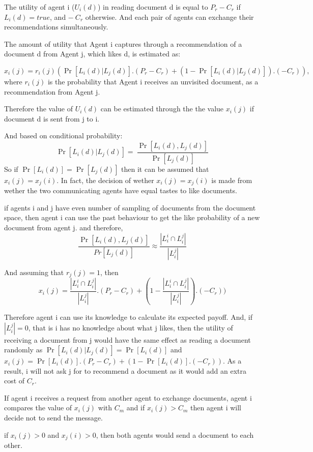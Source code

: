 \documentclass [12pt]{article} \usepackage{multicol}
\begin{document}
	The utility of agent i  ($U_i(d)$) in reading document d is equal to 
$P_r - C_r$ if $L_i(d) = true $, and  $- \ C_r$ otherwise. And each
pair of agents can exchange their recommendations simultaneously.

	The amount of utility that Agent i captures through a
recommendation of a document d from Agent j, which likes d, is
estimated as:

	$$ x_i(j) = r_i(j) (\Pr[L_i(d)| L_j(d)] . (P_r - C_r) +
(1-\Pr[L_i(d)|L_j(d)]). (-C_r)),  $$ where $r_i(j)$ is the
probability that Agent i receives an unvisited document, as
a recommendation from Agent j.

	Therefore the value of $U_i(d)$  can be estimated through the the
value $ x_i(j)$ if document d is sent from j to i.

	And based on conditional probability: $$ \Pr[L_i(d)|L_j(d)]= \
\frac{\Pr[L_i(d), L_j(d)]}{\Pr[L_j(d)]} $$ So if  $ \Pr[L_i(d)] =
\Pr[L_j(d)] $ then it can be assumed that $x_i(j) = x_j(i)$. In fact, the
decision of wether $x_i(j) = x_j(i)$ is made from wether the two
communicating agents have equal tastes to like documents.

if agents i and j have even number of sampling of documents from the document space, then 
agent i can use the past behaviour to get the like probability of a new document from agent j. 
and therefore, $$ \frac{\Pr[L_i(d),L_j(d)]}{Pr[L_j(d)]}  \approx \frac {| L_i^i \cap  L_i^j|} {|L^j_i|}   $$  

And assuming that $r_j(j)=1$, then $$ x_i(j) = \frac {| L_i^i \cap  L_i^j|} {|L^j_i|} . (P_r - C_r) +
(1- \frac {| L_i^i \cap  L_i^j|} {|L^j_i|}). (-C_r)) $$

Therefore agent i can use its knowledge to  calculate its expected payoff.
And, if $ |L_i^j| = 0 $, that is i has no knowledge about what j likes, then the utility of receiving a document from j would 
have the same effect as reading a document randomly as $ \Pr[L_i(d)| L_j(d)] = \Pr[L_i(d)]$ and  
$x_i(j) = \Pr[L_i(d)] . (P_r - C_r) + (1- \Pr[L_i(d)]. (-C_r)) $. As a result, i will not ask j for to recommend a document as it would
add an extra cost of $C_r$.

If agent i receives a request from another agent to exchange documents, agent i compares
the value of  $x_i(j)$ with $C_m$ and if $ x_i(j) > C_m $ then agent i will decide not to send
the message.


if $x_i(j) > 0$  and $x_j(i) > 0$, then both agents would send a document to each other. 
\end{document}
